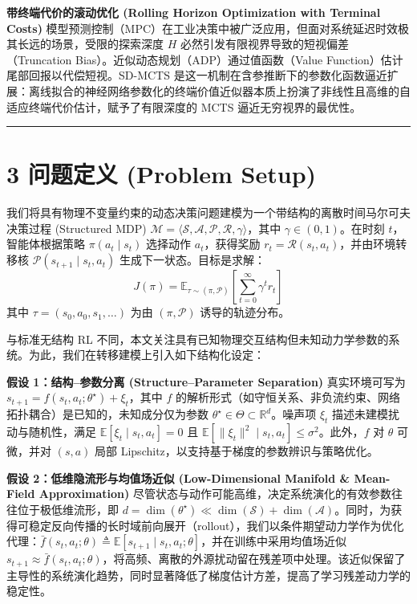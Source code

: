 \documentclass[UTF8]{ctexart}
\begin{document}
\textbf{带终端代价的滚动优化 (Rolling Horizon Optimization with Terminal
Costs)}
模型预测控制（MPC）在工业决策中被广泛应用，但面对系统延迟时效极其长远的场景，受限的探索深度
\(H\) 必然引发有限视界导致的短视偏差（Truncation
Bias）。近似动态规划（ADP）通过值函数（Value
Function）估计尾部回报以代偿短视。SD-MCTS
是这一机制在含参推断下的参数化函数逼近扩展：离线拟合的神经网络参数化的终端价值近似器本质上扮演了非线性且高维的自适应终端代价估计，赋予了有限深度的
MCTS 逼近无穷视界的最优性。

\begin{center}\rule{0.5\linewidth}{0.4pt}\end{center}

\hypertarget{sec-problem-setup}{%
\section{3 问题定义 (Problem
Setup)}\label{sec-problem-setup}}

我们将具有物理不变量约束的动态决策问题建模为一个带结构的离散时间马尔可夫决策过程
(Structured MDP)
\(\mathcal{M}=\langle \mathcal{S},\mathcal{A},\mathcal{P},\mathcal{R},\gamma\rangle\)，其中
\(\gamma\in(0,1)\)。在时刻 \(t\)，智能体根据策略 \(\pi(a_t\mid s_t)\)
选择动作 \(a_t\)，获得奖励 \(r_t=\mathcal{R}(s_t,a_t)\)，并由环境转移核
\(\mathcal{P}(s_{t+1}\mid s_t,a_t)\) 生成下一状态。目标是求解： \[
J(\pi)=\mathbb{E}_{\tau\sim(\pi,\mathcal{P})}\!\left[\sum_{t=0}^{\infty}\gamma^t r_t\right]
\] 其中 \(\tau=(s_0,a_0,s_1,\ldots)\) 为由 \((\pi,\mathcal{P})\)
诱导的轨迹分布。

与标准无结构 RL
不同，本文关注具有已知物理交互结构但未知动力学参数的系统。为此，我们在转移建模上引入如下结构化设定：

\textbf{假设 1：结构--参数分离 (Structure--Parameter Separation)}
真实环境可写为 \( s_{t+1}=f(s_t,a_t;\theta^\star)+\xi_t \)，其中 \(f\)
的解析形式（如守恒关系、非负流约束、网络拓扑耦合）是已知的，未知成分仅为参数
\(\theta^\star\in\Theta\subset\mathbb{R}^d\)。噪声项 \(\xi_t\)
描述未建模扰动与随机性，满足 \(\mathbb{E}[\xi_t\mid s_t,a_t]=0\) 且
\(\mathbb{E}\!\left[\|\xi_t\|^2\mid s_t,a_t\right]\le \sigma^2\)。此外，\(f\)
对 \(\theta\) 可微，并对 \((s,a)\) 局部
Lipschitz，以支持基于梯度的参数辨识与策略优化。

\textbf{假设 2：低维隐流形与均值场近似 (Low-Dimensional Manifold \&
Mean-Field Approximation)}
尽管状态与动作可能高维，决定系统演化的有效参数往往位于极低维流形，即
\(d=\dim(\theta^\star)\ll \dim(\mathcal{S})+\dim(\mathcal{A})\)。同时，为获得可稳定反向传播的长时域前向展开（rollout），我们以条件期望动力学作为优化代理：\(\bar f(s_t,a_t;\theta)\triangleq \mathbb{E}[s_{t+1}\mid s_t,a_t;\theta]\)，并在训练中采用均值场近似
\(s_{t+1}\approx \bar f(s_t,a_t;\theta)\)，将高频、离散的外源扰动留在残差项中处理。该近似保留了主导性的系统演化趋势，同时显著降低了梯度估计方差，提高了学习残差动力学的稳定性。
\end{document}
